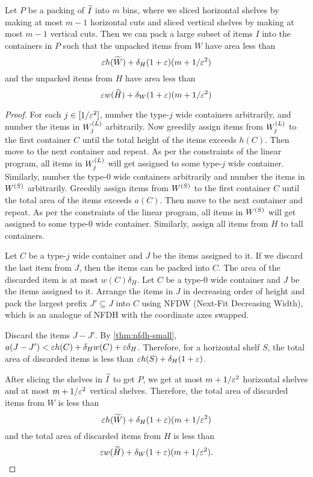 \begin{lemma}
\label{thm:discard-area-ub}
Let $P$ be a packing of $\widetilde{I}$ into $m$ bins, where we sliced horizontal shelves by making
at most $m-1$ horizontal cuts and sliced vertical shelves by making at most $m-1$ vertical cuts.
Then we can pack a large subset of items $I$ into the containers in $P$ such that
the unpacked items from $W$ have area less than
\[ \varepsilon h(\widetilde{W}) + \delta_H(1 + \varepsilon)(m + 1/\varepsilon^2) \]
and the unpacked items from $H$ have area less than
\[ \varepsilon w(\widetilde{H}) + \delta_W(1 + \varepsilon)(m + 1/\varepsilon^2) \]
\end{lemma}
\begin{proof}
For each $j \in [1/\varepsilon^2]$, number the type-$j$ wide containers arbitrarily,
and number the items in $W^{(L)}_j$ arbitrarily.
Now greedily assign items from $W^{(L)}_j$ to the first container $C$ until the total height
of the items exceeds $h(C)$. Then move to the next container and repeat.
As per the constraints of the linear program, all items in $W^{(L)}_j$
will get assigned to some type-$j$ wide container.
Similarly, number the type-0 wide containers arbitrarily
and number the items in $W^{(S)}$ arbitrarily.
Greedily assign items from $W^{(S)}$ to the first container $C$ until the total area
of the items exceeds $a(C)$. Then move to the next container and repeat.
As per the constraints of the linear program, all items in $W^{(S)}$
will get assigned to some type-0 wide container.
Similarly, assign all items from $H$ to tall containers.

Let $C$ be a type-$j$ wide container and $J$ be the items assigned to it.
If we discard the last item from $J$, then the items can be packed into $C$.
The area of the discarded item is at most $w(C)\delta_H$.
Let $C$ be a type-0 wide container and $J$ be the items assigned to it.
Arrange the items in $J$ in decreasing order of height and pack the largest
prefix $J' \subseteq J$ into $C$ using NFDW (Next-Fit Decreasing Width),
which is an analogue of NFDH with the coordinate axes swapped.

Discard the items $J - J'$. By \cref{thm:nfdh-small},
$a(J - J') < \varepsilon h(C) + \delta_H w(C) + \varepsilon\delta_H$.
Therefore, for a horizontal shelf $S$, the total area of discarded items is less than
$\varepsilon h(S) + \delta_H(1 + \varepsilon)$.

After slicing the shelves in $\widetilde{I}$ to get $P$,
we get at most $m + 1/\varepsilon^2$ horizontal shelves
and at most $m + 1/\varepsilon^2$ vertical shelves.
Therefore, the total area of discarded items from $W$ is less than
\[ \varepsilon h(\widetilde{W}) + \delta_H(1 + \varepsilon)(m + 1/\varepsilon^2) \]
and the total area of discarded items from $H$ is less than
\[ \varepsilon w(\widetilde{H}) + \delta_W(1 + \varepsilon)(m + 1/\varepsilon^2). \qedhere \]
\end{proof}

